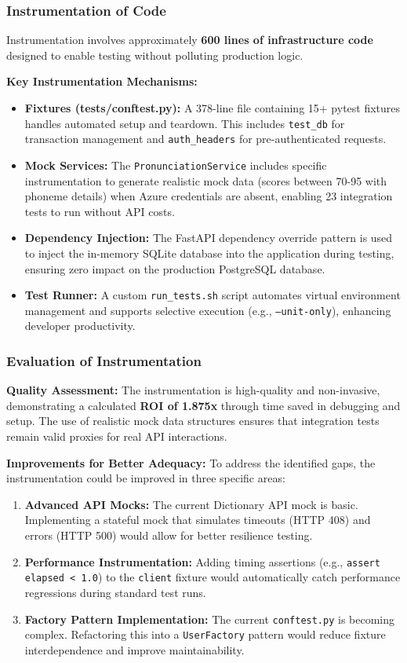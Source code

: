 \documentclass[sigconf]{acmart}
\begin{document}
\subsubsection{Instrumentation of Code}

Instrumentation involves approximately \textbf{600 lines of infrastructure code} designed to enable testing without polluting production logic.

\textbf{Key Instrumentation Mechanisms:}
\begin{itemize}
    \item \textbf{Fixtures (tests/conftest.py):} A 378-line file containing 15+ pytest fixtures handles automated setup and teardown. This includes \texttt{test\_db} for transaction management and \texttt{auth\_headers} for pre-authenticated requests.
    \item \textbf{Mock Services:} The \texttt{PronunciationService} includes specific instrumentation to generate realistic mock data (scores between 70-95 with phoneme details) when Azure credentials are absent, enabling 23 integration tests to run without API costs.
    \item \textbf{Dependency Injection:} The FastAPI dependency override pattern is used to inject the in-memory SQLite database into the application during testing, ensuring zero impact on the production PostgreSQL database.
    \item \textbf{Test Runner:} A custom \texttt{run\_tests.sh} script automates virtual environment management and supports selective execution (e.g., \texttt{--unit-only}), enhancing developer productivity.
\end{itemize}

\subsubsection{Evaluation of Instrumentation}

\textbf{Quality Assessment:}
The instrumentation is high-quality and non-invasive, demonstrating a calculated \textbf{ROI of 1.875x} through time saved in debugging and setup. The use of realistic mock data structures ensures that integration tests remain valid proxies for real API interactions.

\textbf{Improvements for Better Adequacy:}
To address the identified gaps, the instrumentation could be improved in three specific areas:
\begin{enumerate}
    \item \textbf{Advanced API Mocks:} The current Dictionary API mock is basic. Implementing a stateful mock that simulates timeouts (HTTP 408) and errors (HTTP 500) would allow for better resilience testing.
    \item \textbf{Performance Instrumentation:} Adding timing assertions (e.g., \texttt{assert elapsed < 1.0}) to the \texttt{client} fixture would automatically catch performance regressions during standard test runs.
    \item \textbf{Factory Pattern Implementation:} The current \texttt{conftest.py} is becoming complex. Refactoring this into a \texttt{UserFactory} pattern would reduce fixture interdependence and improve maintainability.
\end{enumerate}
\end{document}
